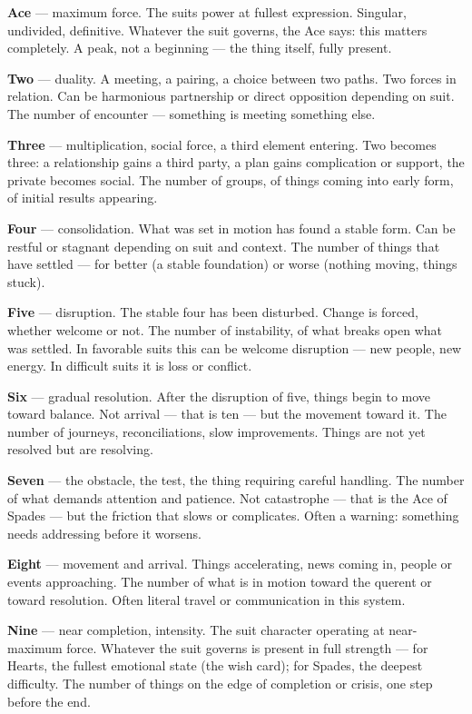 \textbf{Ace} --- maximum force. The suit\textquotesingle s power at fullest expression. Singular, undivided, definitive. Whatever the suit governs, the Ace says: this matters completely. A peak, not a beginning --- the thing itself, fully present.

\textbf{Two} --- duality. A meeting, a pairing, a choice between two paths. Two forces in relation. Can be harmonious partnership or direct opposition depending on suit. The number of encounter --- something is meeting something else.

\textbf{Three} --- multiplication, social force, a third element entering. Two becomes three: a relationship gains a third party, a plan gains complication or support, the private becomes social. The number of groups, of things coming into early form, of initial results appearing.

\textbf{Four} --- consolidation. What was set in motion has found a stable form. Can be restful or stagnant depending on suit and context. The number of things that have settled --- for better (a stable foundation) or worse (nothing moving, things stuck).

\textbf{Five} --- disruption. The stable four has been disturbed. Change is forced, whether welcome or not. The number of instability, of what breaks open what was settled. In favorable suits this can be welcome disruption --- new people, new energy. In difficult suits it is loss or conflict.

\textbf{Six} --- gradual resolution. After the disruption of five, things begin to move toward balance. Not arrival --- that is ten --- but the movement toward it. The number of journeys, reconciliations, slow improvements. Things are not yet resolved but are resolving.

\textbf{Seven} --- the obstacle, the test, the thing requiring careful handling. The number of what demands attention and patience. Not catastrophe --- that is the Ace of Spades --- but the friction that slows or complicates. Often a warning: something needs addressing before it worsens.

\textbf{Eight} --- movement and arrival. Things accelerating, news coming in, people or events approaching. The number of what is in motion toward the querent or toward resolution. Often literal travel or communication in this system.

\textbf{Nine} --- near completion, intensity. The suit character operating at near-maximum force. Whatever the suit governs is present in full strength --- for Hearts, the fullest emotional state (the wish card); for Spades, the deepest difficulty. The number of things on the edge of completion or crisis, one step before the end.

